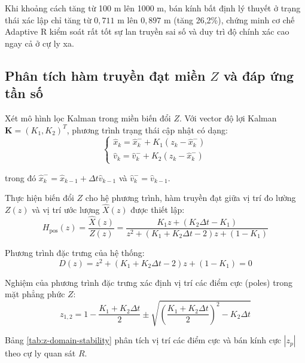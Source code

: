 Khi khoảng cách tăng từ 100 m lên 1000 m, bán kính bất định lý thuyết ở trạng thái xác lập chỉ tăng từ $0{,}711$ m lên $0{,}897$ m (tăng 26,2\%), chứng minh cơ chế Adaptive R kiểm soát rất tốt sự lan truyền sai số và duy trì độ chính xác cao ngay cả ở cự ly xa.

\subsection{Phân tích hàm truyền đạt miền \texorpdfstring{$Z$}{Z} và đáp ứng tần số}

\hspace{0.5cm} Xét mô hình lọc Kalman trong miền biến đổi $Z$. Với vector độ lợi Kalman $\mathbf{K} = (K_1, K_2)^T$, phương trình trạng thái cập nhật có dạng:
\begin{equation}
\begin{cases}
\hat{x}_k = \hat{x}_k^- + K_1 (z_k - \hat{x}_k^-) \\
\hat{v}_k = \hat{v}_k^- + K_2 (z_k - \hat{x}_k^-)
\end{cases}
\label{eq:state-update-scalar}
\end{equation}

trong đó $\hat{x}_k^- = \hat{x}_{k-1} + \Delta t \hat{v}_{k-1}$ và $\hat{v}_k^- = \hat{v}_{k-1}$.

Thực hiện biến đổi $Z$ cho hệ phương trình, hàm truyền đạt giữa vị trí đo lường $Z(z)$ và vị trí ước lượng $\hat{X}(z)$ được thiết lập:
\begin{equation}
H_{\text{pos}}(z) = \frac{\hat{X}(z)}{Z(z)} = \frac{K_1 z + (K_2 \Delta t - K_1)}{z^2 + (K_1 + K_2 \Delta t - 2) z + (1 - K_1)}
\label{eq:z-transfer-function}
\end{equation}

Phương trình đặc trưng của hệ thống:
\begin{equation}
D(z) = z^2 + (K_1 + K_2 \Delta t - 2) z + (1 - K_1) = 0
\label{eq:characteristic-equation}
\end{equation}

Nghiệm của phương trình đặc trưng xác định vị trí các điểm cực (poles) trong mặt phẳng phức $Z$:
\begin{equation}
z_{1,2} = 1 - \frac{K_1 + K_2 \Delta t}{2} \pm \sqrt{\left(\frac{K_1 + K_2 \Delta t}{2}\right)^2 - K_2 \Delta t}
\label{eq:z-poles}
\end{equation}

Bảng \ref{tab:z-domain-stability} phân tích vị trí các điểm cực và bán kính cực $|z_p|$ theo cự ly quan sát $R$.

